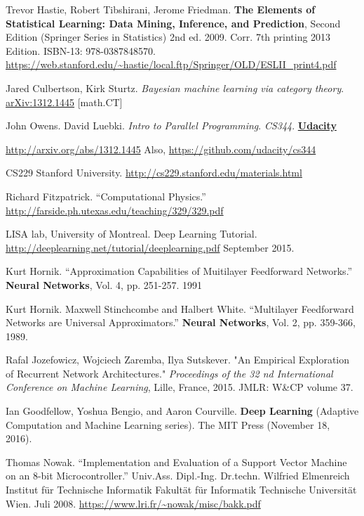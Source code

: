 \documentclass[10pt]{amsart}
\begin{document}
\begin{thebibliography}{9}
Trevor Hastie, Robert Tibshirani, Jerome Friedman.   \textbf{The Elements of Statistical Learning: Data Mining, Inference, and Prediction}, Second Edition (Springer Series in Statistics) 2nd ed. 2009. Corr. 7th printing 2013 Edition.  ISBN-13: 978-0387848570.  \url{https://web.stanford.edu/~hastie/local.ftp/Springer/OLD/ESLII_print4.pdf}

Jared Culbertson, Kirk Sturtz.  \emph{Bayesian machine learning via category theory}.  \href{http://arxiv.org/abs/1312.1445}{arXiv:1312.1445} [math.CT]

John Owens.  David Luebki.  \emph{Intro to Parallel Programming}.  \emph{CS344}.  \textbf{\href{https://www.udacity.com/}{Udacity}}  
  
\url{http://arxiv.org/abs/1312.1445} Also, \url{https://github.com/udacity/cs344}  

CS229 Stanford University.  \url{http://cs229.stanford.edu/materials.html}


Richard Fitzpatrick.  ``Computational Physics.''  \url{http://farside.ph.utexas.edu/teaching/329/329.pdf}

LISA lab, University of Montreal.  Deep Learning Tutorial.  \url{http://deeplearning.net/tutorial/deeplearning.pdf}  September 2015.  



Kurt Hornik. ``Approximation Capabilities of Muitilayer Feedforward Networks.''  \textbf{Neural Networks}, Vol. 4, pp. 251-257. 1991

Kurt Hornik. Maxwell Stinchcombe and Halbert White.  ``Multilayer Feedforward Networks are Universal Approximators.''  \textbf{Neural Networks}, Vol. 2, pp. 359-366, 1989.  


Rafal Jozefowicz, Wojciech Zaremba, Ilya Sutskever.  "An Empirical Exploration of Recurrent Network Architectures."  \emph{Proceedings of the 32 nd International Conference on Machine Learning}, Lille, France, 2015. JMLR: W\&CP volume 37.

Ian Goodfellow, Yoshua Bengio, and Aaron Courville.  \textbf{Deep Learning} (Adaptive Computation and Machine Learning series).  The MIT Press (November 18, 2016).  




Thomas Nowak.  ``Implementation and Evaluation of a Support Vector Machine on an 8-bit Microcontroller.''  Univ.Ass. Dipl.-Ing. Dr.techn. Wilfried Elmenreich Institut f\"{u}r Technische Informatik Fakult\"{a}t f\"{u}r Informatik Technische Universit\"{a}t Wien.  Juli 2008.  \url{https://www.lri.fr/~nowak/misc/bakk.pdf}




\end{thebibliography}
\end{document}
